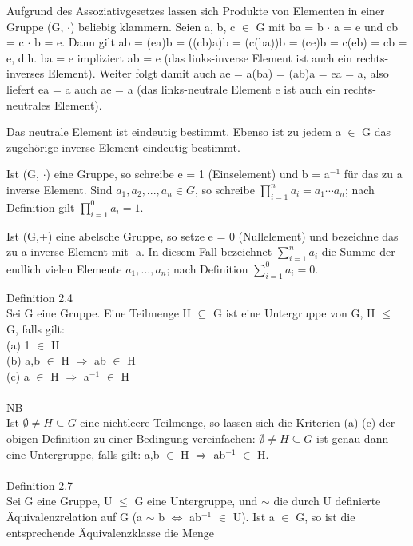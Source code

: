 \documentclass[fontsize=10pt]{scrartcl}
\begin{document}
\begin{compactitem}
\item Aufgrund des Assoziativgesetzes lassen sich Produkte von Elementen in einer Gruppe (G, $\cdot$) beliebig klammern. Seien a, b, c $\in$ G mit ba = b $\cdot$ a = e und cb = c $\cdot$ b = e. Dann gilt 
ab = (ea)b = ((cb)a)b = (c(ba))b = (ce)b = c(eb) = cb = e, d.h. ba = e impliziert ab = e (das links-inverse Element ist auch ein rechts-inverses Element). Weiter folgt damit auch ae = a(ba) = (ab)a = ea = a, also liefert ea = a auch ae = a (das links-neutrale Element e ist auch ein rechts-neutrales Element).
\item Das neutrale Element ist eindeutig bestimmt. Ebenso ist zu jedem a $\in$ G das zugehörige inverse Element eindeutig bestimmt.
\item Ist (G, $\cdot$) eine Gruppe, so schreibe e = 1 (Einselement) und b = a$^{-1}$ für das zu a inverse Element. Sind $a_1, a_2, . . . , a_n \in G$, so schreibe $\prod\nolimits_{i=1}^{n} a_i = a_1 \cdots a_n$; nach Definition gilt $\prod\nolimits_{i=1}^{0}a_i = 1$.
\item Ist (G,+) eine abelsche Gruppe, so setze e = 0 (Nullelement) und bezeichne das zu a inverse Element mit -a. In diesem Fall bezeichnet $\sum\nolimits_{i=1}^{n} a_i$ die Summe der endlich vielen Elemente $a_1, . . . , a_n$; nach Definition $\sum\nolimits_{i=1}^{0} a_i = 0$. \\
\end{compactitem}
Definition 2.4\\
Sei G eine Gruppe. Eine Teilmenge H $\subseteq$ G ist eine Untergruppe von G, H $\le$ G, falls gilt:\\
(a) 1 $\in$ H\\ 
(b) a,b $\in$ H $\Rightarrow$ ab $\in$ H\\ 
(c) a $\in$ H $\Rightarrow$ a$^{-1}$ $\in$ H\\ 
\\
\newpage
NB\\
Ist $\emptyset \neq H \subseteq G$ eine nichtleere Teilmenge, so lassen sich die Kriterien (a)-(c) der obigen Definition zu einer Bedingung vereinfachen: 
$\emptyset \neq H \subseteq G$ ist genau dann eine Untergruppe, falls gilt: a,b $\in$ H $\Rightarrow$ ab$^{-1}$ $\in$ H.\\
\\
Definition 2.7\\
Sei G eine Gruppe, U $\le$ G eine Untergruppe, und $\sim$ die durch U definierte Äquivalenzrelation auf G (a $\sim$ b $\Leftrightarrow$ ab$^{-1}$ $\in$ U). Ist a $\in$ G, so ist die entsprechende Äquivalenzklasse die Menge 
\end{document}
